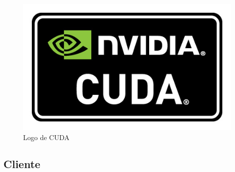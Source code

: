 \begin{itemize}
		\bigskip
		\begin{figure}[h]
			\centering
			\includegraphics[width=0.3\linewidth]{../images/cudalogo}
			\caption[Logo de CUDA]{Logo de CUDA}
			\label{fig:cudalogo}
		\end{figure}
	
			
\end{itemize}
	

\bigskip
\subsection{Cliente}
\bigskip


